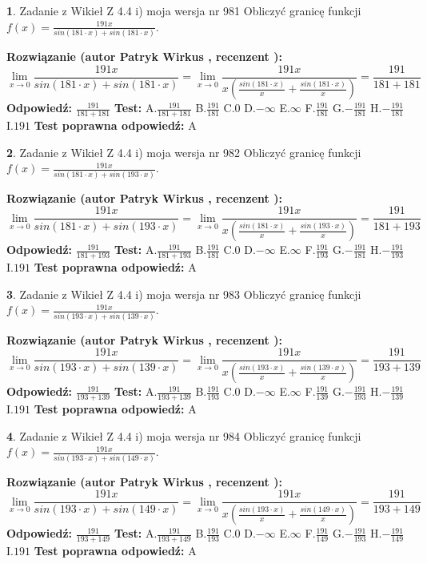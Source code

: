 \documentclass[12pt, a4paper]{article}
\theoremstyle{definition} %
\newtheorem{zad}{}
\newcommand{\zadStart}[1]{\begin{zad}#1\newline}
\newcommand{\zadStop}{\end{zad}}
\newcommand{\rozwStart}[2]{\noindent \textbf{Rozwiązanie (autor #1 , recenzent #2): }\newline}
\newcommand{\rozwStop}{\newline}
\newcommand{\odpStart}{\noindent \textbf{Odpowiedź:}\newline}
\newcommand{\odpStop}{\newline}
\newcommand{\testStart}{\noindent \textbf{Test:}\newline}
\newcommand{\testStop}{\newline}
\newcommand{\kluczStart}{\noindent \textbf{Test poprawna odpowiedź:}\newline}
\newcommand{\kluczStop}{\newline}
\begin{document}
\zadStart{Zadanie z Wikieł Z 4.4 i) moja wersja nr 981}
Obliczyć granicę funkcji $f(x)=\frac{191x}{sin(181\cdot x) +sin(181\cdot x)}$.
\zadStop
\rozwStart{Patryk Wirkus}{}
$$\lim\limits_{x\to 0}\frac{191x}{sin(181\cdot x) +sin(181\cdot x)}=\lim\limits_{x\to 0}\frac{191x}{x(\frac{sin(181\cdot x)}{x}+\frac{sin(181\cdot x)}{x})}=\frac{191}{181+181}$$
\rozwStop
\odpStart
$\frac{191}{181+181}$
\odpStop
\testStart
A.$\frac{191}{181+181}$
B.$\frac{191}{181}$
C.$0$
D.$-\infty$
E.$\infty$
F.$\frac{191}{181}$
G.$-\frac{191}{181}$
H.$-\frac{191}{181}$
I.$191$
\testStop
\kluczStart
A
\kluczStop



\zadStart{Zadanie z Wikieł Z 4.4 i) moja wersja nr 982}
Obliczyć granicę funkcji $f(x)=\frac{191x}{sin(181\cdot x) +sin(193\cdot x)}$.
\zadStop
\rozwStart{Patryk Wirkus}{}
$$\lim\limits_{x\to 0}\frac{191x}{sin(181\cdot x) +sin(193\cdot x)}=\lim\limits_{x\to 0}\frac{191x}{x(\frac{sin(181\cdot x)}{x}+\frac{sin(193\cdot x)}{x})}=\frac{191}{181+193}$$
\rozwStop
\odpStart
$\frac{191}{181+193}$
\odpStop
\testStart
A.$\frac{191}{181+193}$
B.$\frac{191}{181}$
C.$0$
D.$-\infty$
E.$\infty$
F.$\frac{191}{193}$
G.$-\frac{191}{181}$
H.$-\frac{191}{193}$
I.$191$
\testStop
\kluczStart
A
\kluczStop



\zadStart{Zadanie z Wikieł Z 4.4 i) moja wersja nr 983}
Obliczyć granicę funkcji $f(x)=\frac{191x}{sin(193\cdot x) +sin(139\cdot x)}$.
\zadStop
\rozwStart{Patryk Wirkus}{}
$$\lim\limits_{x\to 0}\frac{191x}{sin(193\cdot x) +sin(139\cdot x)}=\lim\limits_{x\to 0}\frac{191x}{x(\frac{sin(193\cdot x)}{x}+\frac{sin(139\cdot x)}{x})}=\frac{191}{193+139}$$
\rozwStop
\odpStart
$\frac{191}{193+139}$
\odpStop
\testStart
A.$\frac{191}{193+139}$
B.$\frac{191}{193}$
C.$0$
D.$-\infty$
E.$\infty$
F.$\frac{191}{139}$
G.$-\frac{191}{193}$
H.$-\frac{191}{139}$
I.$191$
\testStop
\kluczStart
A
\kluczStop



\zadStart{Zadanie z Wikieł Z 4.4 i) moja wersja nr 984}
Obliczyć granicę funkcji $f(x)=\frac{191x}{sin(193\cdot x) +sin(149\cdot x)}$.
\zadStop
\rozwStart{Patryk Wirkus}{}
$$\lim\limits_{x\to 0}\frac{191x}{sin(193\cdot x) +sin(149\cdot x)}=\lim\limits_{x\to 0}\frac{191x}{x(\frac{sin(193\cdot x)}{x}+\frac{sin(149\cdot x)}{x})}=\frac{191}{193+149}$$
\rozwStop
\odpStart
$\frac{191}{193+149}$
\odpStop
\testStart
A.$\frac{191}{193+149}$
B.$\frac{191}{193}$
C.$0$
D.$-\infty$
E.$\infty$
F.$\frac{191}{149}$
G.$-\frac{191}{193}$
H.$-\frac{191}{149}$
I.$191$
\testStop
\kluczStart
A
\kluczStop
\end{document}
